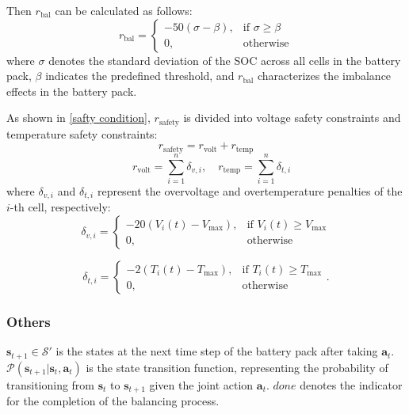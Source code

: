 \documentclass[journal]{IEEEtran}
\begin{document}
Then $r_{\text{bal}}$ can be calculated as follows:
\begin{equation}
  r_{\text{bal}} = 
\begin{cases}
-50(\sigma - \beta), & \text{if } \sigma \geq \beta \\
0, & \text{otherwise}
\end{cases}  
\end{equation}
where $\sigma$ denotes the standard deviation of the SOC across all cells in the battery pack, $\beta$ indicates the predefined threshold, and $r_{\text{bal}}$ characterizes the imbalance effects in the battery pack. 

As shown in \eqref{safty condition}, $r_{\text{safety}}$ is divided into voltage safety constraints and temperature safety constraints:
\begin{equation}
    r_{\text{safety}} = r_{\text{volt}} + r_{\text{temp}}
\end{equation}
\begin{equation}
    \quad r_{\text{volt}} = \sum_{i=1}^{n} \delta_{v,i}, \quad r_{\text{temp}} = \sum_{i=1}^{n} \delta_{t,i}
\end{equation}
where $\delta_{v,i}$ and $\delta_{t,i}$ represent the overvoltage and overtemperature penalties of the $i$-th cell, respectively:
\begin{equation}
    \delta_{v,i} = 
\begin{cases}
-20(V_i(t) - V_{\text{max}}), & \text{if } V_i(t) \geq V_{\text{max}} \\
0, & \text{otherwise}
\end{cases}
\end{equation}

\begin{equation}
  \delta_{t,i} = 
\begin{cases}
-2(T_i(t) - T_{\text{max}}), & \text{if } T_i(t) \geq T_{\text{max}} \\
0, & \text{otherwise}
\end{cases}  .
\end{equation}
\subsubsection{Others} $\mathbf{s}_{t+1} \in \mathcal{S'}$ is the states at the next time step of the battery pack after taking $\mathbf{a}_t$. $\mathcal{P}(\mathbf{s}_{t+1}|\mathbf{s}_t, \mathbf{a}_t)$ is the state transition function, representing the probability of transitioning from $\mathbf{s}_t$ to $\mathbf{s}_{t+1}$ given the joint action $\mathbf{a}_t$. $done$ denotes the indicator for the completion of the balancing process.
\end{document}
